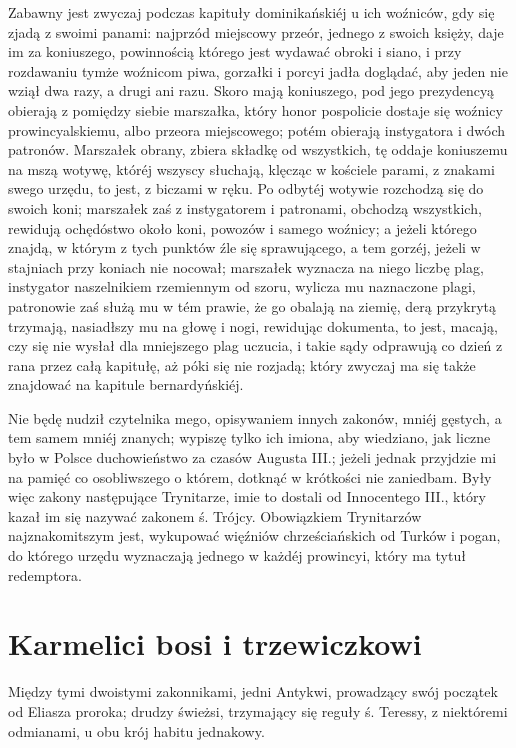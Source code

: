 \documentclass{book}
\begin{document}
Zabawny jest zwyczaj podczas kapituły dominikańskiéj u ich woźniców, gdy się zjadą z swoimi panami: najprzód miejscowy przeór, jednego z swoich księży, daje im za koniuszego, powinnością którego jest wydawać obroki i siano, i przy rozdawaniu tymże woźnicom piwa, gorzałki i porcyi jadła doglądać, aby jeden nie wziął dwa razy, a drugi ani razu. Skoro mają koniuszego, pod jego prezydencyą obierają z pomiędzy siebie marszałka, który honor pospolicie dostaje się woźnicy prowincyalskiemu, albo przeora miejscowego; potém obierają instygatora i dwóch patronów. Marszałek obrany, zbiera składkę od wszystkich, tę oddaje koniuszemu na mszą wotywę, któréj wszyscy słuchają, klęcząc w kościele parami, z znakami swego urzędu, to jest, z biczami w ręku. Po odbytéj wotywie rozchodzą się do swoich koni; marszałek zaś z instygatorem i patronami, obchodzą wszystkich, rewidują ochędóstwo około koni, powozów i samego woźnicy; a jeżeli którego znajdą, w którym z tych punktów źle się sprawującego, a tem gorzéj, jeżeli w stajniach przy koniach nie nocował; marszałek wyznacza na niego liczbę plag, instygator naszelnikiem rzemiennym od szoru, wylicza mu naznaczone plagi, patronowie zaś służą mu w tém prawie, że go obalają na ziemię, derą przykrytą trzymają, nasiadłszy mu na głowę i nogi, rewidując dokumenta, to jest, macają, czy się nie wysłał dla mniejszego plag uczucia, i takie sądy odprawują co dzień z rana przez całą kapitułę, aż póki się nie rozjadą; który zwyczaj ma się także znajdować na kapitule bernardyńskiéj.

Nie będę nudził czytelnika mego, opisywaniem innych zakonów, mniéj gęstych, a tem samem mniéj znanych; wypiszę tylko ich imiona, aby wiedziano, jak liczne było w Polsce duchowieństwo za czasów Augusta III.; jeżeli jednak przyjdzie mi na pamięć co osobliwszego o którem, dotknąć w krótkości nie zaniedbam. Były więc zakony następujące Trynitarze, imie to dostali od Innocentego III., który kazał im się nazywać zakonem ś. Trójcy. Obowiązkiem Trynitarzów najznakomitszym jest, wykupować więźniów chrześciańskich od Turków i pogan, do którego urzędu wyznaczają jednego w każdéj prowincyi, który ma tytuł redemptora.

\section{Karmelici bosi i trzewiczkowi}

Między tymi dwoistymi zakonnikami, jedni Antykwi, prowadzący swój początek od Eliasza proroka; drudzy świeżsi, trzymający się reguły ś. Teressy, z niektóremi odmianami, u obu krój habitu jednakowy.
\end{document}

